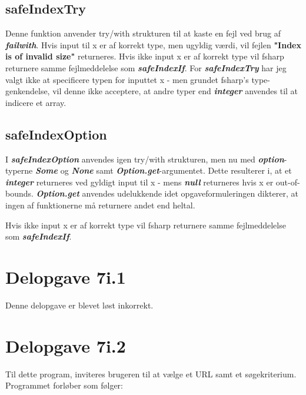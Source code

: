 \documentclass[a4paper,10pt]{article}
\begin{document}
\subsection{safeIndexTry}
Denne funktion anvender try/with strukturen til at kaste en fejl ved brug af \textbf{\textit{failwith}}. Hvis input til x er af korrekt type, men ugyldig værdi, vil fejlen \textbf{"Index is of invalid size"} returneres. Hvis ikke input x er af korrekt type vil fsharp returnere samme fejlmeddelelse som \textbf{\textit{safeIndexIf}}. For \textbf{\textit{safeIndexTry}} har jeg valgt ikke at specificere typen for inputtet x - men grundet fsharp's type-genkendelse, vil denne ikke acceptere, at andre typer end \textbf{\textit{integer}} anvendes til at indicere et array. 

\subsection{safeIndexOption}
I \textbf{\textit{safeIndexOption}} anvendes igen try/with strukturen, men nu med \textbf{\textit{option}}-typerne \textbf{\textit{Some}} og \textbf{\textit{None}} samt \textbf{\textit{Option.get}}-argumentet. Dette resulterer i, at et \textbf{\textit{integer}} returneres ved gyldigt input til x - mens \textbf{\textit{null}} returneres hvis x er out-of-bounds. \textbf{\textit{Option.get}} anvendes udelukkende idet opgaveformuleringen dikterer, at ingen af funktionerne må returnere andet end heltal. 

Hvis ikke input x er af korrekt type vil fsharp returnere samme fejlmeddelelse som \textbf{\textit{safeIndexIf}}.

\section{Delopgave 7i.1}
Denne delopgave er blevet løst inkorrekt. 


\section{Delopgave 7i.2}
Til dette program, inviteres brugeren til at vælge et URL samt et søgekriterium. Programmet forløber som følger:
\end{document}

